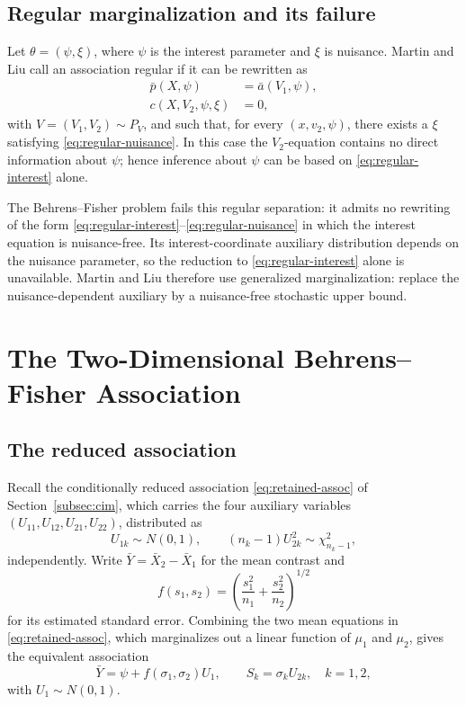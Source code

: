 \documentclass[12pt]{article}
\begin{document}
\subsection{Regular marginalization and its failure}

Let \(\theta=(\psi,\xi)\), where \(\psi\) is the interest parameter and
\(\xi\) is nuisance.  Martin and Liu call an association regular if it can be
rewritten as
\begin{align}
\bar p(X,\psi)&=\bar a(V_1,\psi), \label{eq:regular-interest}\\
c(X,V_2,\psi,\xi)&=0, \label{eq:regular-nuisance}
\end{align}
with \(V=(V_1,V_2)\sim P_V\), and such that, for every
\((x,v_2,\psi)\), there exists a \(\xi\) satisfying
\eqref{eq:regular-nuisance}.  In this case the \(V_2\)-equation contains no
direct information about \(\psi\); hence inference about \(\psi\) can be
based on \eqref{eq:regular-interest} alone.

The Behrens--Fisher problem fails this regular separation: it admits no
rewriting of the form \eqref{eq:regular-interest}--\eqref{eq:regular-nuisance}
in which the interest equation is nuisance-free.  Its interest-coordinate
auxiliary distribution depends on the nuisance parameter, so the reduction to
\eqref{eq:regular-interest} alone is unavailable.  Martin and Liu therefore use
generalized marginalization: replace the nuisance-dependent auxiliary by a
nuisance-free stochastic upper bound.

\section{The Two-Dimensional Behrens--Fisher Association}
\label{sec:assoc}

\subsection{The reduced association}
\label{subsec:reduced}

Recall the conditionally reduced association \eqref{eq:retained-assoc} of
Section~\ref{subsec:cim}, which carries the four auxiliary variables
\((U_{11},U_{12},U_{21},U_{22})\), distributed as
\[
U_{1k}\sim N(0,1),\qquad
(n_k-1)U_{2k}^2\sim\chi^2_{n_k-1},
\]
independently.  Write \(\bar Y=\bar X_2-\bar X_1\) for the mean contrast and
\[
f(s_1,s_2)=\left(\frac{s_1^2}{n_1}+\frac{s_2^2}{n_2}\right)^{1/2}
\]
for its estimated standard error.  Combining the two mean equations in
\eqref{eq:retained-assoc}, which marginalizes out a linear function of
\(\mu_1\) and \(\mu_2\), gives the equivalent association
\[
\bar Y=\psi+f(\sigma_1,\sigma_2)U_1,
\qquad
S_k=\sigma_k U_{2k},\quad k=1,2,
\]
with \(U_1\sim N(0,1)\).
\end{document}
